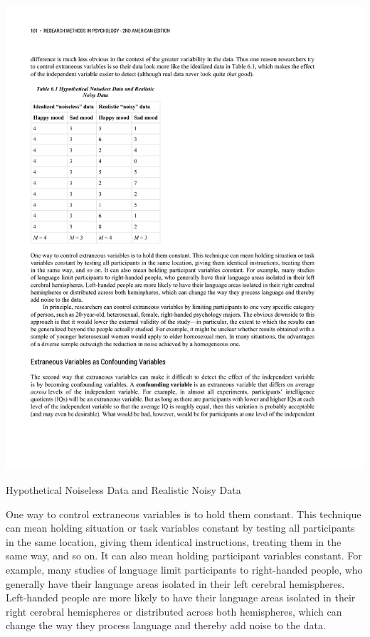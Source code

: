 \begin{marginfigure}[0in]
\includegraphics[width=\linewidth]{figures/C6noisydata.pdf}
\caption{Hypothetical Noiseless Data and Realistic Noisy Data}
\label{fig:noisydata}
\end{marginfigure}
 
One way to control extraneous variables is to hold them constant. This technique can mean holding situation or task variables constant by testing all participants in the same location, giving them identical instructions, treating them in the same way, and so on. It can also mean holding participant variables constant. For example, many studies of language limit participants to right-handed people, who generally have their language areas isolated in their left cerebral hemispheres. Left-handed people are more likely to have their language areas isolated in their right cerebral hemispheres or distributed across both hemispheres, which can change the way they process language and thereby add noise to the data.

